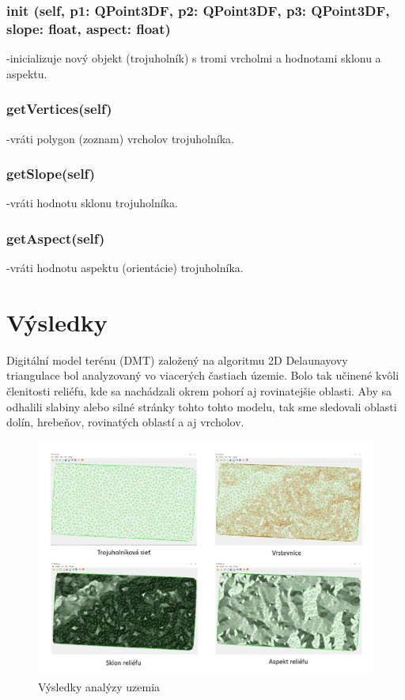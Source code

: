 \documentclass[12pt]{article}
\begin{document}
\subsubsection*{\textunderscore \textunderscore init \textunderscore \textunderscore (self, p1: QPoint3DF, p2: QPoint3DF, p3: QPoint3DF, slope: float, aspect: float)}
\noindent-inicializuje nový objekt (trojuholník) s tromi vrcholmi a hodnotami sklonu a aspektu.
\subsubsection*{getVertices(self)}
\noindent-vráti polygon (zoznam) vrcholov trojuholníka.
\subsubsection*{getSlope(self)}
\noindent-vráti hodnotu sklonu trojuholníka.
\subsubsection*{getAspect(self)}
\noindent-vráti hodnotu aspektu (orientácie) trojuholníka.
\section*{Výsledky}
Digitální model terénu (DMT) založený na algoritmu 2D Delaunayovy triangulace bol analyzovaný vo viacerých častiach územie. Bolo tak učinené kvôli členitosti reliéfu, kde sa nachádzali okrem pohorí aj rovinatejšie oblasti. Aby sa odhalili slabiny alebo silné stránky tohto tohto modelu, tak sme sledovali oblasti dolín, hrebeňov, rovinatých oblastí a aj vrcholov. 
\begin{figure}[h]
    \centering
    \includegraphics[width=1\linewidth]{latex/images/vysledky.jpg}
    \caption{Výsledky analýzy uzemia}
    \label{fig:enter-label}
\end{figure}
\newpage
\end{document}
